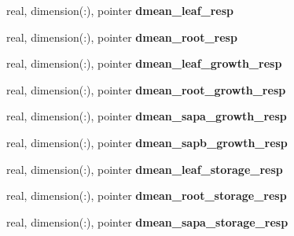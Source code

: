 \begin{DoxyCompactItemize}
\item 
\hypertarget{structed__state__vars_1_1patchtype_afa1f29828e77469183c0fb2abf0deec8}{
real, dimension(:), pointer {\bfseries dmean\_\-leaf\_\-resp}}
\label{structed__state__vars_1_1patchtype_afa1f29828e77469183c0fb2abf0deec8}

\item 
\hypertarget{structed__state__vars_1_1patchtype_ab958feeda24559b2c49a1c97bad32b8f}{
real, dimension(:), pointer {\bfseries dmean\_\-root\_\-resp}}
\label{structed__state__vars_1_1patchtype_ab958feeda24559b2c49a1c97bad32b8f}

\item 
\hypertarget{structed__state__vars_1_1patchtype_a40269910bb17cd3d39bc05d74a166ef5}{
real, dimension(:), pointer {\bfseries dmean\_\-leaf\_\-growth\_\-resp}}
\label{structed__state__vars_1_1patchtype_a40269910bb17cd3d39bc05d74a166ef5}

\item 
\hypertarget{structed__state__vars_1_1patchtype_a92d6e4ce99d0206ebc8b662287a7939e}{
real, dimension(:), pointer {\bfseries dmean\_\-root\_\-growth\_\-resp}}
\label{structed__state__vars_1_1patchtype_a92d6e4ce99d0206ebc8b662287a7939e}

\item 
\hypertarget{structed__state__vars_1_1patchtype_a73954472ece5d34ee78b3dd50d5c0dfd}{
real, dimension(:), pointer {\bfseries dmean\_\-sapa\_\-growth\_\-resp}}
\label{structed__state__vars_1_1patchtype_a73954472ece5d34ee78b3dd50d5c0dfd}

\item 
\hypertarget{structed__state__vars_1_1patchtype_a75f28e14eb4f0384a17e04e736ce9be1}{
real, dimension(:), pointer {\bfseries dmean\_\-sapb\_\-growth\_\-resp}}
\label{structed__state__vars_1_1patchtype_a75f28e14eb4f0384a17e04e736ce9be1}

\item 
\hypertarget{structed__state__vars_1_1patchtype_aecae390e34203449522a8c803826db75}{
real, dimension(:), pointer {\bfseries dmean\_\-leaf\_\-storage\_\-resp}}
\label{structed__state__vars_1_1patchtype_aecae390e34203449522a8c803826db75}

\item 
\hypertarget{structed__state__vars_1_1patchtype_a205418e46d3b65dc50e831a5733a3f03}{
real, dimension(:), pointer {\bfseries dmean\_\-root\_\-storage\_\-resp}}
\label{structed__state__vars_1_1patchtype_a205418e46d3b65dc50e831a5733a3f03}

\item 
\hypertarget{structed__state__vars_1_1patchtype_a422f37f1ad9470ecbf1e78e6578fd4f4}{
real, dimension(:), pointer {\bfseries dmean\_\-sapa\_\-storage\_\-resp}}
\label{structed__state__vars_1_1patchtype_a422f37f1ad9470ecbf1e78e6578fd4f4}


\end{DoxyCompactItemize}
